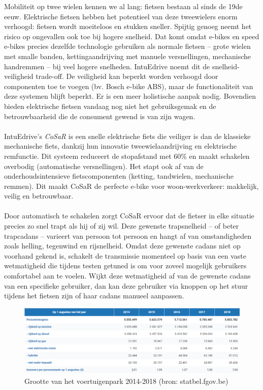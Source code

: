 Mobiliteit op twee wielen kennen we al lang: fietsen bestaan al sinds de 19de eeuw. Elektrische fietsen hebben het potentieel van deze tweewielers enorm verhoogd: fietsen wordt moeiteloos en stukken sneller. Spijtig genoeg neemt het risico op ongevallen ook toe bij hogere snelheid. Dat komt omdat e-bikes en speed e-bikes precies dezelfde technologie gebruiken als normale fietsen – grote wielen met smalle banden, kettingaandrijving met manuele versnellingen, mechanische handremmen – bij veel hogere snelheden. IntuEdrive noemt dit de snelheid-veiligheid trade-off. De veiligheid kan beperkt worden verhoogd door componenten toe te voegen (bv. Bosch e-bike ABS), maar de functionaliteit van deze systemen blijft beperkt. Er is een meer holistische aanpak nodig. Bovendien bieden elektrische fietsen vandaag nog niet het gebruiksgemak en de betrouwbaarheid die de consument gewend is van zijn wagen.
\\\\
IntuEdrive’s \textit{CoSaR} is een snelle elektrische fiets die veiliger is dan de klassieke mechanische fiets, dankzij hun innovatie tweewielaandrijving en elektrische remfunctie. Dit systeem reduceert de stopafstand met 60\% en maakt schakelen overbodig (automatische versnellingen). Het stapt ook af van de onderhoudsintensieve fietscomponenten (ketting, tandwielen, mechanische remmen). Dit maakt CoSaR de perfecte e-bike voor woon-werkverkeer: makkelijk, veilig en betrouwbaar.
\\\\
Door automatisch te schakelen zorgt CoSaR ervoor dat de fietser in elke situatie precies zo snel trapt als hij of zij wil. Deze gewenste trapsnelheid – of beter trapcadans – varieert van persoon tot persoon en hangt af van omstandigheden zoals helling, tegenwind en rijsnelheid. Omdat deze gewenste cadans niet op voorhand gekend is, schakelt de transmissie momenteel op basis van een vaste wetmatigheid die tijdens testen getuned is om voor zoveel mogelijk gebruikers comfortabel aan te voelen. Wijkt deze wetmatigheid af van de gewenste cadans van een specifieke gebruiker, dan kan deze gebruiker via knoppen op het stuur tijdens het fietsen zijn of haar cadans manueel aanpassen.
\\
\begin{figure}
  \includegraphics[width=\linewidth]{images/wagenpark_belgie.png}
  \caption{Grootte van het voertuigenpark 2014-2018 (bron: statbel.fgov.be)}
  \label{fig:wagenpark}
\end{figure}


